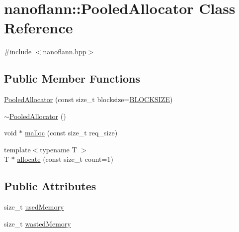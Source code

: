 \hypertarget{classnanoflann_1_1_pooled_allocator}{\section{nanoflann\-:\-:Pooled\-Allocator Class Reference}
\label{classnanoflann_1_1_pooled_allocator}
}


{\ttfamily \#include $<$nanoflann.\-hpp$>$}

\subsection*{Public Member Functions}
\begin{DoxyCompactItemize}
\item 
\hyperlink{classnanoflann_1_1_pooled_allocator_a1a67809090b71951fae104dfe8196f6c}{Pooled\-Allocator} (const size\-\_\-t blocksize=\hyperlink{group__memalloc__grp_gaf4df087b6f47e514f6062f7ada2d19d7}{B\-L\-O\-C\-K\-S\-I\-Z\-E})
\item 
\hyperlink{classnanoflann_1_1_pooled_allocator_a39c53213bc49d0f08fb8e4b0adc25b5e}{$\sim$\-Pooled\-Allocator} ()
\item 
void $\ast$ \hyperlink{classnanoflann_1_1_pooled_allocator_ae6a1cfa103b81762ab700224f1c9d801}{malloc} (const size\-\_\-t req\-\_\-size)
\item 
{\footnotesize template$<$typename T $>$ }\\T $\ast$ \hyperlink{classnanoflann_1_1_pooled_allocator_a389b1614fd2b6fa641c009e698db8b44}{allocate} (const size\-\_\-t count=1)
\end{DoxyCompactItemize}
\subsection*{Public Attributes}
\begin{DoxyCompactItemize}
\item 
size\-\_\-t \hyperlink{classnanoflann_1_1_pooled_allocator_a4152d7a1d043d57aad464f11117d6e90}{used\-Memory}
\item 
size\-\_\-t \hyperlink{classnanoflann_1_1_pooled_allocator_aeb073342f83393f414888292d165738d}{wasted\-Memory}
\end{DoxyCompactItemize}


